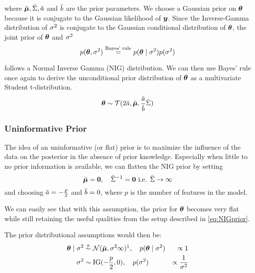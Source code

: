 where $\breve{\bm{\mu}}, \breve{\Sigma}, \breve{a}$ and $\breve{b}$ are the prior parameters.
We choose a Gaussian prior on $\bm{\theta}$ because it is conjugate to the Gaussian likelihood of $\bm{y}$.
Since the Inverse-Gamma distribution of $\sigma^2$ is conjugate to the Gaussian conditional distribution of $\bm{\theta}$, the joint prior of $\bm{\theta}$ and $\sigma^2$
\begin{equation*}
    p(\bm{\theta}, \sigma^2) \overset{\text{Bayes' rule}}{=} p(\bm{\theta} \mid \sigma^2) p(\sigma^2)
\end{equation*}

follows a Normal Inverse Gamma (NIG) distribution.
We can then use Bayes' rule once again to derive the unconditional prior distribution of $\bm{\theta}$ as a multivariate Student t-distribution.
\begin{equation*}
    \bm{\theta} \sim \mathcal{T}(2 \breve{a}, \breve{\bm{\mu}}, \frac{\breve{a}}{\breve{b}} \breve{\Sigma})
\end{equation*}

\subsubsection*{Uninformative Prior}
The idea of an uninformative (or flat) prior is to maximize the influence of the data on the posterior in the absence of prior knowledge.
Especially when little to no prior information is available, we can flatten the NIG prior by setting
\begin{equation*}
    \breve{\bm{\mu}} = \bm{0}, \quad \breve{\Sigma}^{-1} = \bm{0} \text{  i.e. } \breve{\Sigma} \to \infty 
\end{equation*}
and choosing $\breve{a} = - \frac{p}{2}$ and $\breve{b} = 0$, where $p$ is the number of features in the model.

We can easily see that with this assumption, the prior for $\bm{\theta}$ becomes very flat while still retaining the useful qualities from the setup described in \autoref{eq:NIGprior}.

The prior distributional assumptions would then be:
\begin{equation} \label{eq:flat-prior}
    \begin{aligned}
        \btheta \mid \ssd &\overset{a}{\sim}  \Ncal(\mupri, \ssd \infty)\footnotemark, \quad p(\btheta\mid \ssd) &\propto 1\\
        \ssd &\sim \IG(-\frac{p}{2},  0), \quad p(\ssd) &\propto \frac{1}{\ssd}
    \end{aligned}
\end{equation}


